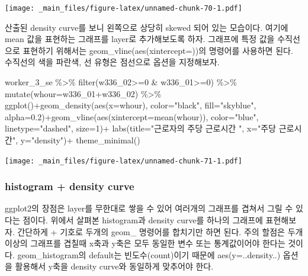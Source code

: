 \documentclass[
]{book}
\newenvironment{Shaded}{\begin{snugshade}}{\end{snugshade}}
\newcommand{\AttributeTok}[1]{\textcolor[rgb]{0.77,0.63,0.00}{#1}}
\newcommand{\DecValTok}[1]{\textcolor[rgb]{0.00,0.00,0.81}{#1}}
\newcommand{\FloatTok}[1]{\textcolor[rgb]{0.00,0.00,0.81}{#1}}
\newcommand{\FunctionTok}[1]{\textcolor[rgb]{0.00,0.00,0.00}{#1}}
\newcommand{\NormalTok}[1]{#1}
\newcommand{\SpecialCharTok}[1]{\textcolor[rgb]{0.00,0.00,0.00}{#1}}
\newcommand{\StringTok}[1]{\textcolor[rgb]{0.31,0.60,0.02}{#1}}
\theoremstyle{definition}
\theoremstyle{definition}
\theoremstyle{definition}
\theoremstyle{definition}
\theoremstyle{remark}
\begin{document}
\texttt{[image: \_main\_files/figure-latex/unnamed-chunk-70-1.pdf]}

산출된 density curve를 보니 왼쪽으로 상당히 skewed 되어 있는 모습이다. 여기에 mean 값을 표현하는 그래프를 layer로 추가해보도록 하자. 그래프에 특정 값을 수직선으로 표현하기 위해서는 geom\_vline(aes(xintercept=))의 명령어를 사용하면 된다. 수직선의 색을 파란색, 선 유형은 점선으로 옵션을 지정해보자.

\begin{Shaded}
\begin{Highlighting}[]
\NormalTok{worker\_3\_se }\SpecialCharTok{\%\textgreater{}\%} 
  \FunctionTok{filter}\NormalTok{(w336\_02}\SpecialCharTok{\textgreater{}=}\DecValTok{0} \SpecialCharTok{\&}\NormalTok{ w336\_01}\SpecialCharTok{\textgreater{}=}\DecValTok{0}\NormalTok{) }\SpecialCharTok{\%\textgreater{}\%} 
  \FunctionTok{mutate}\NormalTok{(}\AttributeTok{whour=}\NormalTok{w336\_01}\SpecialCharTok{+}\NormalTok{w336\_02) }\SpecialCharTok{\%\textgreater{}\%} 
  \FunctionTok{ggplot}\NormalTok{()}\SpecialCharTok{+}\FunctionTok{geom\_density}\NormalTok{(}\FunctionTok{aes}\NormalTok{(}\AttributeTok{x=}\NormalTok{whour), }\AttributeTok{color=}\StringTok{"black"}\NormalTok{, }\AttributeTok{fill=}\StringTok{"skyblue"}\NormalTok{, }\AttributeTok{alpha=}\FloatTok{0.2}\NormalTok{)}\SpecialCharTok{+}\FunctionTok{geom\_vline}\NormalTok{(}\FunctionTok{aes}\NormalTok{(}\AttributeTok{xintercept=}\FunctionTok{mean}\NormalTok{(whour)), }\AttributeTok{color=}\StringTok{"blue"}\NormalTok{, }\AttributeTok{linetype=}\StringTok{"dashed"}\NormalTok{, }\AttributeTok{size=}\DecValTok{1}\NormalTok{)}\SpecialCharTok{+}
  \FunctionTok{labs}\NormalTok{(}\AttributeTok{title=}\StringTok{"근로자의 주당 근로시간 "}\NormalTok{, }\AttributeTok{x=}\StringTok{"주당 근로시간"}\NormalTok{, }\AttributeTok{y=}\StringTok{"density"}\NormalTok{)}\SpecialCharTok{+}
  \FunctionTok{theme\_minimal}\NormalTok{()}
\end{Highlighting}
\end{Shaded}

\texttt{[image: \_main\_files/figure-latex/unnamed-chunk-71-1.pdf]}

\hypertarget{histogram-density-curve}{%
\subsubsection{histogram + density curve}\label{histogram-density-curve}}

ggplot2의 장점은 layer를 무한대로 쌓을 수 있어 여러개의 그래프를 겹쳐서 그릴 수 있다는 점이다. 위에서 살펴본 histogram과 density curve를 하나의 그래프에 표현해보자. 간단하게 + 기호로 두개의 geom\_ 명령어를 합치기만 하면 된다. 주의 할점은 두개 이상의 그래프를 겹칠때 x축과 y축은 모두 동일한 변수 또는 통계값이어야 한다는 것이다. geom\_histogram의 default는 빈도수(count)이기 때문에 aes(y=..density..) 옵션을 활용해서 y축을 density curve와 동일하게 맞추어야 한다.
\end{document}
